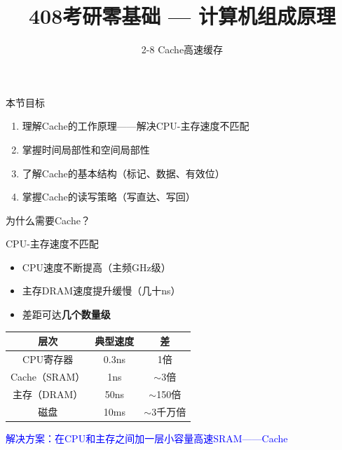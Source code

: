 \documentclass[10pt, aspectratio=169]{beamer}
\title{408考研零基础 --- 计算机组成原理}
\subtitle{2-8 Cache高速缓存}
\author{}
\date{}
\begin{document}
\begin{frame}{本节目标}
    \begin{enumerate}
        \item 理解Cache的工作原理——解决CPU-主存速度不匹配
        \item 掌握时间局部性和空间局部性
        \item 了解Cache的基本结构（标记、数据、有效位）
        \item 掌握Cache的读写策略（写直达、写回）
    \end{enumerate}
\end{frame}

\begin{frame}[t]{为什么需要Cache？}
    \begin{block}{CPU-主存速度不匹配}
        \begin{itemize}
            \item CPU速度不断提高（主频GHz级）
            \item 主存DRAM速度提升缓慢（几十ns）
            \item 差距可达\textbf{几个数量级}
        \end{itemize}
    \end{block}
    \vspace{0.3em}
    \begin{center}
        \begin{tabular}{|c|c|c|}
            \hline
            \textbf{层次} & \textbf{典型速度} & \textbf{差} \\
            \hline
            CPU寄存器 & 0.3ns & 1倍 \\
            \hline
            Cache（SRAM） & 1ns & $\sim$3倍 \\
            \hline
            主存（DRAM） & 50ns & $\sim$150倍 \\
            \hline
            磁盘 & 10ms & $\sim$3千万倍 \\
            \hline
        \end{tabular}
    \end{center}
    \vspace{0.3em}
    \begin{center}
        \textcolor{blue}{解决方案：在CPU和主存之间加一层小容量高速SRAM——Cache}
    \end{center}
\end{frame}
\end{document}
